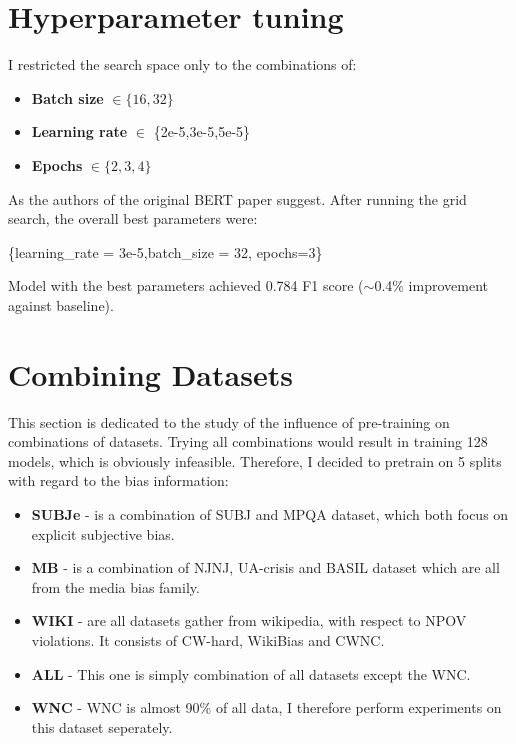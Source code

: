 \newpage

 \section{Hyperparameter tuning}
I restricted the search space only to the combinations of:
 \begin{itemize}
     \item \textbf{Batch size} $\in \{16,32\}$
     \item \textbf{Learning rate} $\in $ \{2e-5,3e-5,5e-5\}
     \item \textbf{Epochs} $\in \{2,3,4\}$
 \end{itemize}
 
 As the authors of the original BERT paper suggest.  After running the grid search, the overall best parameters were:
 \begin{center}
      \{learning\_rate = 3e-5,batch\_size = 32, epochs=3\}
 \end{center}
 
 Model with the best parameters achieved 0.784 F1 score ($\sim$0.4\% improvement against baseline).


 
 






\section{Combining Datasets}
This section is dedicated to the study of the influence of pre-training on combinations of datasets. Trying all combinations would result in training 128 models, which is obviously infeasible. Therefore, I decided to pretrain on 5 splits with regard to the bias information:
\begin{itemize}
    \item \textbf{SUBJe} - is a combination of SUBJ and MPQA dataset, which both focus on explicit subjective bias.
    \item \textbf{MB} - is a combination of NJNJ, UA-crisis and BASIL dataset which are all from the media bias family.
    \item \textbf{WIKI} - are all datasets gather from wikipedia, with respect to NPOV violations. It consists of CW-hard, WikiBias and CWNC.
    \item \textbf{ALL} - This one is simply combination of all datasets except the WNC.
    \item \textbf{WNC} - WNC is almost 90\% of all data, I therefore perform experiments on this dataset seperately.
\end{itemize}
 
